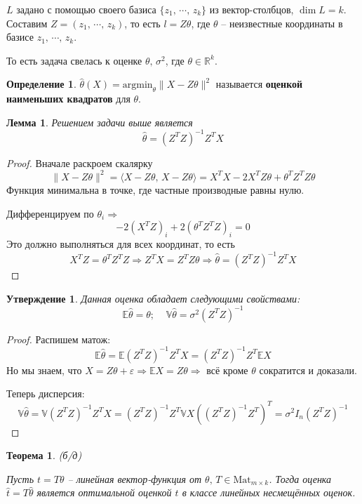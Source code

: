 \documentclass[a4paper,12pt]{article}
\theoremstyle{plain}
\newtheorem{theorem}{Теорема}[section]
\newtheorem{lemma}{Лемма}[section]
\newtheorem{proposition}{Утверждение}[section]
\theoremstyle{definition}
\newtheorem{definition}{Определение}[section]
\theoremstyle{remark}
\begin{document}
$L$ задано с помощью своего базиса $\{z_1,\,\cdots,\,z_k\}$ из вектор-столбцов, $\dim L = k$. Составим $Z = (z_1,\,\cdots,\,z_k)$, то есть $l = Z\theta$, где $\theta$ -- неизвестные координаты в базисе $z_1,\,\cdots,\,z_k$.

То есть задача свелась к оценке $\theta,\, \sigma^2$, где $\theta \in \mathbb{R}^k$.

\begin{definition}
  $\hat{\theta}(X) = \text{argmin}_\theta\|X - Z\theta\|^2$ называется \textbf{оценкой наименьших квадратов} для $\theta$.
\end{definition}

\begin{lemma}
  Решением задачи выше является
  \[
    \hat{\theta} = (Z^TZ)^{-1}Z^TX
  \]
\end{lemma}

\begin{proof}
  Вначале раскроем скалярку
  \[
    \|X - Z\theta\|^2 = \langle X - Z\theta,\, X - Z\theta\rangle = X^TX - 2X^TZ\theta + \theta^TZ^TZ\theta
  \]
  Функция минимальна в точке, где частные производные равны нулю.

  Дифференцируем по $\theta_i \Rightarrow$
  \[
    -2(X^TZ)_i + 2(\theta^TZ^TZ)_i = 0
  \]
  Это должно выполняться для всех координат, то есть
  \[
    X^TZ = \theta^TZ^TZ \Rightarrow Z^TX = Z^TZ\theta \Rightarrow \hat{\theta} = (Z^TZ)^{-1}Z^TX
  \]
\end{proof}

\begin{proposition}
  Данная оценка обладает следующими свойствами:
  \[
    \mathbb{E}\hat{\theta} = \theta;\;\;\;\; \mathbb{V}\hat{\theta} = \sigma^2(Z^TZ)^{-1}
  \]
\end{proposition}

\begin{proof}
  Распишем матож:
  \[
    \mathbb{E}\hat{\theta} = \mathbb{E}(Z^TZ)^{-1}Z^TX = (Z^TZ)^{-1}Z^T\mathbb{E}X
  \]
  Но мы знаем, что $X = Z\theta + \varepsilon \Rightarrow \mathbb{E}X = Z\theta \Rightarrow$ всё кроме $\theta$ сократится и доказали.

  Теперь дисперсия:
  \[
    \mathbb{V}\hat{\theta} = \mathbb{V}(Z^TZ)^{-1}Z^TX = (Z^TZ)^{-1}Z^T\mathbb{V}X((Z^TZ)^{-1}Z^T)^T = \sigma^2I_n(Z^TZ)^{-1}
  \]
\end{proof}

\begin{theorem}
  (б/д)

  Пусть $t = T\theta$ -- линейная вектор-функция от $\theta,\, T \in \text{Mat}_{m \times k}$. Тогда оценка $\hat{t} = T\hat{\theta}$ является оптимальной оценкой $t$ в классе линейных несмещённых оценок.
\end{theorem}
\end{document}
